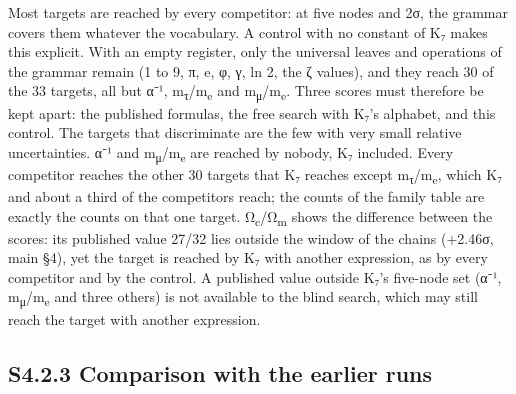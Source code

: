 \documentclass[11pt,a4paper]{article}
\begin{document}
Most targets are reached by every competitor: at five nodes and 2σ, the grammar covers them whatever the vocabulary. A control with no constant of K₇ makes this explicit. With an empty register, only the universal leaves and operations of the grammar remain (1 to 9, π, e, φ, γ, ln 2, the ζ values), and they reach 30 of the 33 targets, all but α⁻¹, m\textsubscript{τ}/m\textsubscript{e} and m\textsubscript{μ}/m\textsubscript{e}. Three scores must therefore be kept apart: the published formulas, the free search with K₇'s alphabet, and this control. The targets that discriminate are the few with very small relative uncertainties. α⁻¹ and m\textsubscript{μ}/m\textsubscript{e} are reached by nobody, K₇ included. Every competitor reaches the other 30 targets that K₇ reaches except m\textsubscript{τ}/m\textsubscript{e}, which K₇ and about a third of the competitors reach; the counts of the family table are exactly the counts on that one target. Ω\textsubscript{c}/Ω\textsubscript{m} shows the difference between the scores: its published value 27/32 lies outside the window of the chains (+2.46σ, main §4), yet the target is reached by K₇ with another expression, as by every competitor and by the control. A published value outside K₇'s five-node set (α⁻¹, m\textsubscript{μ}/m\textsubscript{e} and three others) is not available to the blind search, which may still reach the target with another expression.

\subsection{S4.2.3 Comparison with the earlier runs}\label{s4.2.3-comparison-with-the-earlier-runs}
\end{document}
